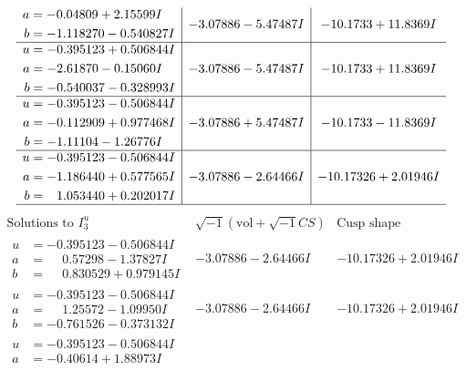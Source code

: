 \documentclass[1p]{elsarticle_modified}
\theoremstyle{definition}
\newcommand{\I}{\sqrt{-1}}
\begin{document}
$$\begin{array}{c|c|c}
\begin{aligned}
a &= -0.04809 + 2.15599 I \\
b &= -1.118270 - 0.540827 I\end{aligned}
 & -3.07886 - 5.47487 I & -10.1733 + 11.8369 I \\ \hline\begin{aligned}
u &= -0.395123 + 0.506844 I \\
a &= -2.61870 - 0.15060 I \\
b &= -0.540037 - 0.328993 I\end{aligned}
 & -3.07886 - 5.47487 I & -10.1733 + 11.8369 I \\ \hline\begin{aligned}
u &= -0.395123 - 0.506844 I \\
a &= -0.112909 + 0.977468 I \\
b &= -1.11104 - 1.26776 I\end{aligned}
 & -3.07886 + 5.47487 I & -10.1733 - 11.8369 I \\ \hline\begin{aligned}
u &= -0.395123 - 0.506844 I \\
a &= -1.186440 + 0.577565 I \\
b &= \phantom{-}1.053440 + 0.202017 I\end{aligned}
 & -3.07886 - 2.64466 I & -10.17326 + 2.01946 I\\
 \hline 
 \end{array}$$\newpage$$\begin{array}{c|c|c}  
\text{Solutions to }I^u_{3}& \I (\text{vol} + \sqrt{-1}CS) & \text{Cusp shape}\\
 \hline 
\begin{aligned}
u &= -0.395123 - 0.506844 I \\
a &= \phantom{-}0.57298 - 1.37827 I \\
b &= \phantom{-}0.830529 + 0.979145 I\end{aligned}
 & -3.07886 - 2.64466 I & -10.17326 + 2.01946 I \\ \hline\begin{aligned}
u &= -0.395123 - 0.506844 I \\
a &= \phantom{-}1.25572 - 1.09950 I \\
b &= -0.761526 - 0.373132 I\end{aligned}
 & -3.07886 - 2.64466 I & -10.17326 + 2.01946 I \\ \hline\begin{aligned}
u &= -0.395123 - 0.506844 I \\
a &= -0.40614 + 1.88973 I \\

\end{aligned}
\end{array}$$
\end{document}

